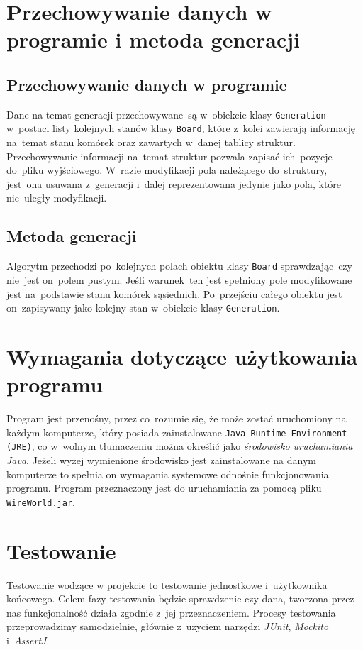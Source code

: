 \documentclass[a4paper,11pt]{article}
\begin{document}
    \section{Przechowywanie danych w programie i metoda generacji}
        \subsection{Przechowywanie danych w programie}
        Dane na temat generacji przechowywane~są w~obiekcie klasy \texttt{Generation} w~postaci listy kolejnych stanów klasy \texttt{Board}, które z~kolei zawierają informację na~temat stanu komórek oraz zawartych w~danej tablicy struktur. Przechowywanie informacji na~temat struktur pozwala zapisać ich~pozycje do~pliku wyjściowego. W~razie modyfikacji pola należącego do~struktury, jest~ona usuwana z~generacji i~dalej reprezentowana jedynie jako pola, które nie~uległy modyfikacji.
        \subsection{Metoda generacji}
        Algorytm przechodzi po~kolejnych polach obiektu klasy \texttt{Board} sprawdzając~czy nie~jest on~polem pustym. Jeśli warunek~ten jest spełniony pole modyfikowane jest na~podstawie stanu komórek sąsiednich. Po~przejściu całego obiektu jest on~zapisywany jako kolejny stan w~obiekcie klasy \texttt{Generation}.
	\section{Wymagania dotyczące użytkowania programu}
		Program jest przenośny, przez co~rozumie się, że może zostać uruchomiony na każdym komputerze, który posiada zainstalowane \texttt{Java Runtime Environment (JRE)}, co w~wolnym tłumaczeniu można określić jako \textsl{środowisko uruchamiania Java}. Jeżeli wyżej wymienione środowisko jest zainstalowane na danym komputerze to spełnia on wymagania systemowe odnośnie funkcjonowania programu. Program przeznaczony jest do uruchamiania za pomocą pliku \texttt{WireWorld.jar}. 
	\section{Testowanie}
		Testowanie wodzące w projekcie to testowanie jednostkowe i~użytkownika końcowego. Celem fazy testowania będzie sprawdzenie czy dana, tworzona przez nas funkcjonalność działa zgodnie z~jej przeznaczeniem. Procesy testowania  przeprowadzimy samodzielnie, głównie z~użyciem narzędzi \textsl{JUnit}, \textsl{Mockito} i~\textsl{AssertJ}.
\end{document}
